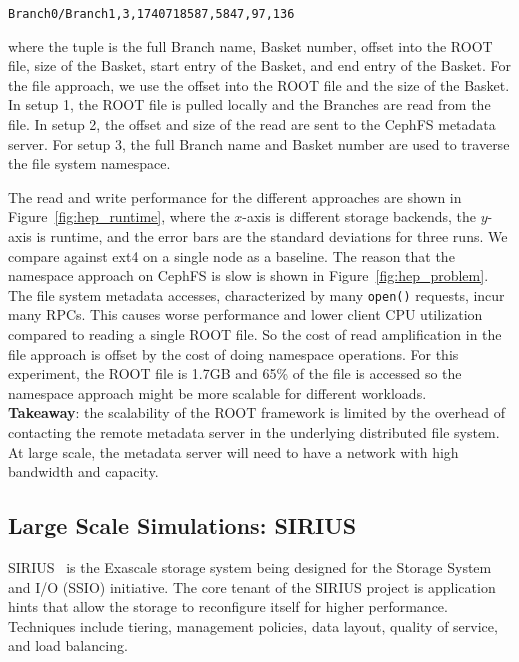 \texttt{Branch0/Branch1,3,1740718587,5847,97,136}

where the tuple is the full Branch name, Basket number, offset into the ROOT
file, size of the Basket, start entry of the Basket, and end entry of the
Basket.  For the file approach, we use the offset into the ROOT file and the
size of the Basket.  In setup 1, the ROOT file is pulled locally and the
Branches are read from the file. In setup 2, the offset and size of the read
are sent to the CephFS metadata server.  For setup 3, the full Branch name and
Basket number are used to traverse the file system namespace.


The read and write performance for the different approaches are shown in
Figure~\ref{fig:hep_runtime}, where the \(x\)-axis is different storage
backends, the \(y\)-axis is runtime, and the error bars are the standard
deviations for three runs. We compare against ext4 on a single node as a
baseline. The reason that the namespace approach on CephFS is slow is shown in
Figure~\ref{fig:hep_problem}. The file system metadata accesses, characterized
by many \texttt{open()} requests, incur many RPCs. This causes worse
performance and lower client CPU utilization compared to reading a single ROOT
file.  So the cost of read amplification in the file approach is offset by the
cost of doing namespace operations. For this experiment, the ROOT file is 1.7GB
and 65\% of the file is accessed so the namespace approach might be more
scalable for different workloads.\\

\noindent\textbf{Takeaway}: the scalability of the ROOT framework is limited by the
overhead of contacting the remote metadata server in the underlying distributed
file system. At large scale, the metadata server will need to have a network
with high bandwidth and capacity.

\subsection{Large Scale Simulations: SIRIUS}

SIRIUS~\cite{klasky:journal16-sirius} is the Exascale storage system being
designed for the Storage System and I/O (SSIO) initiative. The core tenant of
the SIRIUS project is application hints that allow the storage to reconfigure
itself for higher performance. Techniques include tiering, management policies,
data layout, quality of service, and load balancing. 

